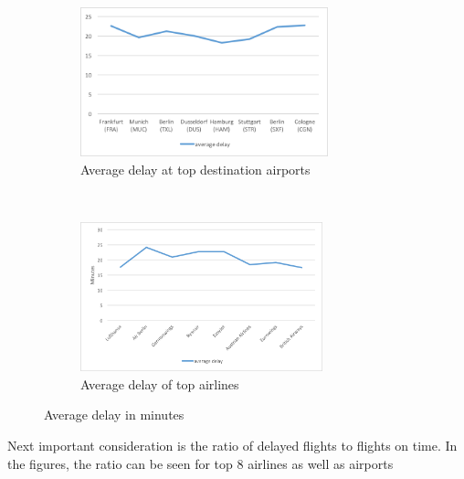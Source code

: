 \begin{figure}[h]
    \centering
    \begin{subfigure}[h]{0.5\textwidth}
        \centering
        \includegraphics[height=1.7in]{Figures/airport_delay.png}
        \caption{Average delay at top destination airports}
    \end{subfigure}%
    ~ 
    \begin{subfigure}[h]{0.5\textwidth}
        \centering
        \includegraphics[height=1.7in]{Figures/airline_delay.png}
        \caption{Average delay of top airlines}
    \end{subfigure}
    \caption{Average delay in minutes}
\end{figure}

Next important consideration is the ratio of delayed flights to flights on time. In the figures, the ratio can be seen for top 8 airlines as well as airports


